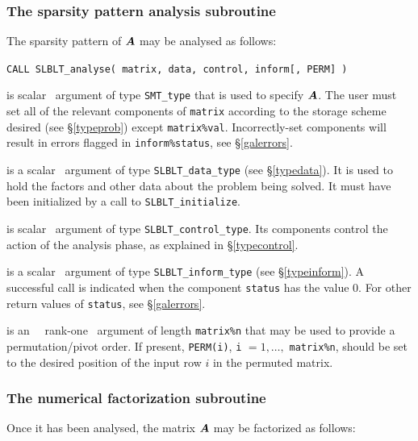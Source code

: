 \documentclass{galahad}
\newcommand{\packagename}{SLBLT}
\begin{document}

\subsubsection{The sparsity pattern analysis subroutine}
The sparsity pattern of ${\bm{A}}$ may be analysed as follows:

\hskip0.5in
{\tt CALL \packagename\_analyse( matrix, data, control, inform[, PERM] )}

\begin{description}
 is scalar \intentin\ argument of type {\tt SMT\_type}
that is used to specify ${\bm{A}}$.
The user must set all of the relevant components of {\tt matrix} according
to the storage scheme desired (see \S\ref{typeprob}) except
{\tt matrix\%val}. Incorrectly-set components will result in errors
flagged in {\tt inform\%status}, see \S\ref{galerrors}.

 is a scalar \intentinout\ argument of type
{\tt \packagename\_data\_type}
(see \S\ref{typedata}). It is used to hold the factors and other
data about the problem being solved.
It must have been initialized by a call to
{\tt \packagename\_ini\-tialize}.

 is scalar \intentin\ argument of type
{\tt \packagename\_control\_type}. Its components control the action
of the analysis phase, as explained in
\S\ref{typecontrol}.

 is a scalar \intentinout\ argument of type
{\tt \packagename\_inform\_type}
(see \S\ref{typeinform}).
A successful call is indicated when the  component {\tt status} has the value 0.
For other return values of {\tt status}, see \S\ref{galerrors}.

 is an \optional\ \intentin\ rank-one \integer\ argument of
length {\tt matrix\%n} that may be used to provide a permutation/pivot
order.
If present, {\tt PERM(i)}, {\tt i} $= 1, \ldots,$ {\tt matrix\%n}, should be set
to the desired position of the input row $i$ in the permuted matrix.

\end{description}


\subsubsection{The numerical factorization subroutine}
Once it has been analysed, the matrix ${\bm{A}}$ may be factorized as follows:
\end{document}
